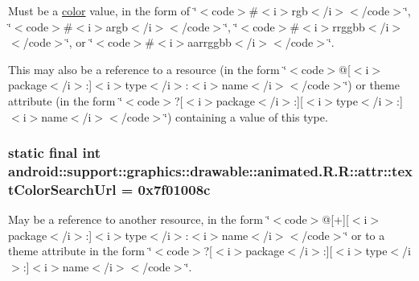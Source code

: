 Must be a \hyperlink{classandroid_1_1support_1_1graphics_1_1drawable_1_1animated_1_1_r_1_1color}{color} value, in the form of \char`\"{}$<$code$>$\#$<$i$>$rgb$<$/i$>$$<$/code$>$\char`\"{}, \char`\"{}$<$code$>$\#$<$i$>$argb$<$/i$>$$<$/code$>$\char`\"{}, \char`\"{}$<$code$>$\#$<$i$>$rrggbb$<$/i$>$$<$/code$>$\char`\"{}, or \char`\"{}$<$code$>$\#$<$i$>$aarrggbb$<$/i$>$$<$/code$>$\char`\"{}. 

This may also be a reference to a resource (in the form \char`\"{}$<$code$>$@\mbox{[}$<$i$>$package$<$/i$>$:\mbox{]}$<$i$>$type$<$/i$>$:$<$i$>$name$<$/i$>$$<$/code$>$\char`\"{}) or theme attribute (in the form \char`\"{}$<$code$>$?\mbox{[}$<$i$>$package$<$/i$>$:\mbox{]}\mbox{[}$<$i$>$type$<$/i$>$:\mbox{]}$<$i$>$name$<$/i$>$$<$/code$>$\char`\"{}) containing a value of this type. \hypertarget{classandroid_1_1support_1_1graphics_1_1drawable_1_1animated_1_1_r_1_1attr_752976725cb94182da532cdd9979cdd0}{
\subsubsection[{textColorSearchUrl}]{\setlength{\rightskip}{0pt plus 5cm}static final int android::support::graphics::drawable::animated.R.R::attr::textColorSearchUrl = 0x7f01008c}}
\label{classandroid_1_1support_1_1graphics_1_1drawable_1_1animated_1_1_r_1_1attr_752976725cb94182da532cdd9979cdd0}


May be a reference to another resource, in the form \char`\"{}$<$code$>$@\mbox{[}+\mbox{]}\mbox{[}$<$i$>$package$<$/i$>$:\mbox{]}$<$i$>$type$<$/i$>$:$<$i$>$name$<$/i$>$$<$/code$>$\char`\"{} or to a theme attribute in the form \char`\"{}$<$code$>$?\mbox{[}$<$i$>$package$<$/i$>$:\mbox{]}\mbox{[}$<$i$>$type$<$/i$>$:\mbox{]}$<$i$>$name$<$/i$>$$<$/code$>$\char`\"{}. 

